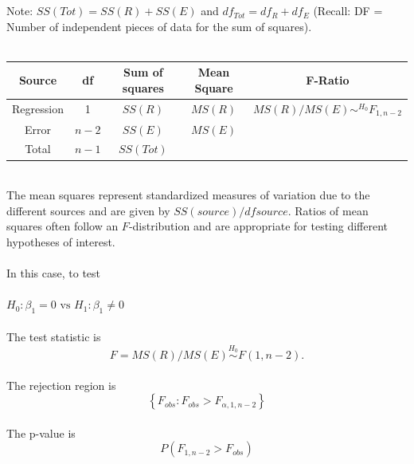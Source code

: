 ~\\~\\
Note: $SS(Tot)=SS(R)+SS(E)$ and $df_{Tot}=df_{R}+df_{E}$  (Recall: DF = Number of independent pieces of data for the sum of squares).\\~\\


\newpage

\begin{tabular}{|c|c|c|c|c|} \hline
Source &  df & Sum of squares &Mean Square & F-Ratio \\ \hline
Regression & 1& $SS(R)$  & $MS(R)$ & $MS(R)/MS(E)\sim^{H_0} F_{1,n-2}$ \\
Error & $n-2$ & $SS(E)$  & $MS(E)$ &  \\
Total & $n-1$ & $SS(Tot)$  & &  \\ \hline
\end{tabular}

~\\The mean squares represent standardized measures of variation due to the different sources and are given by $SS(source)/df source$.  Ratios of mean squares often follow an $F$-distribution and are appropriate for testing different hypotheses of interest.\\~\\
In this case, to test \\~\\
$ H_0: \beta_1 = 0 \mbox{  vs  } H_1:\beta_1 \neq 0$\\~\\
The test statistic is 
$$F = MS(R)/MS(E) \stackrel{H_0}{\sim} F(1,n-2).$$~\\
The rejection region is 
$$\left\{F_{obs}:F_{obs}>F_{\alpha,1,n-2}\right\}$$~\\
The p-value is
$$P(F_{1,n-2}>F_{obs})$$~\\

